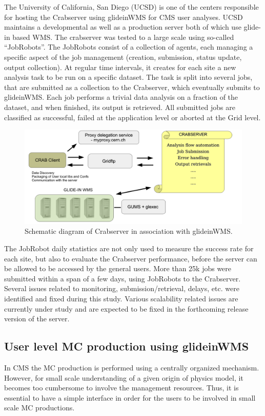 \documentclass[a4paper]{jpconf}
\begin{document}
The University of California, San Diego (UCSD) is one of the centers responsible for hosting 
the Crabserver using glideinWMS for CMS user analyses. UCSD maintains a developmental as well 
as a production server both of which use glide-in based WMS. The crabserver was tested to a large 
scale using so-called ``JobRobots''. The JobRobots consist of a collection of agents, each 
managing a specific aspect of the job management (creation, submission, status
update, output collection). At regular time intervals, it creates for
each site a new analysis task to be run on a specific dataset. The
task is split into several jobs, that are submitted as a collection to
the Crabserver, which eventually submits to glideinWMS. Each job
performs a trivial data analysis on a fraction of the dataset, and when
finished, its output is retrieved. All submitted jobs are classified
as successful, failed at the application level or aborted at the Grid
level.
\begin{figure}
\begin{center}
\includegraphics[scale=0.4]{crabserver}
\end{center}
\caption{Schematic diagram of Crabserver in association with glideinWMS.}
\label{fig:crabserver}
\end{figure}
The JobRobot daily statistics are not only used to measure the success rate for each site, 
but also to evaluate the Crabserver performance, before the server can be allowed 
to be accessed by the general users. More than 25k jobs were submitted within a span of a 
few days, using JobRobots to the Crabserver. Several issues related to monitoring, 
submission/retrieval, delays, etc. were identified and fixed during this study. Various scalability
related issues are currently under study and are expected to be fixed in the forthcoming
release version of the server.
\subsection{User level MC production using glideinWMS}
In CMS the MC production is performed using a centrally organized mechanism. However,
for small scale understanding of a given origin of physics model, it becomes too cumbersome
to involve the management resources. Thus, it is essential to have a simple interface
in order for the users to be involved in small scale MC productions. 
\end{document}
